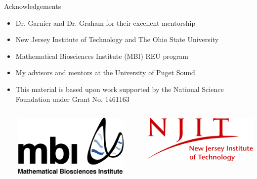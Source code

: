 \begin{frame}{Acknowledgements}
\begin{itemize}
\item Dr. Garnier and Dr. Graham for their excellent mentorship
\item New Jersey Institute of Technology and The Ohio State University
\item Mathematical Biosciences Institute (MBI) REU program
\item My advisors and mentors at the University of Puget Sound
\item This material is based upon work supported by the National Science Foundation under Grant No. 1461163
\end{itemize}
\begin{columns}[T,onlytextwidth]
\column{\textwidth}
\begin{minipage}[]{0.0125\textwidth}
~
\end{minipage}%
\begin{minipage}[]{0.225\textwidth}
    \includegraphics[width=\textwidth]{images/mbiwtext}
\end{minipage}%
\begin{minipage}[]{0.025\textwidth}
~
\end{minipage}%
\begin{minipage}[]{0.225\textwidth}
    \includegraphics[width = \textwidth]{images/Logo_of_New_Jersey_Institute_of_Technology}

\end{minipage}
\end{columns}
\end{frame}
